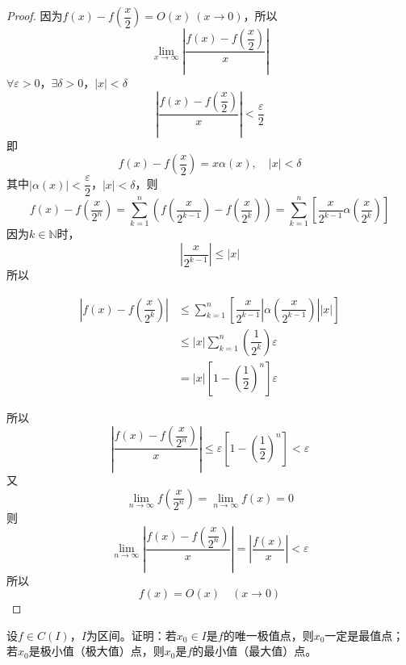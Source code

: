 \begin{proof}

    因为\(f(x) - f\left( \dfrac{x}{2} \right) = O(x) \ (x\to 0)\)，所以
    \[\lim\limits_{x\to\infty}{\left| \dfrac{f(x) - f\left( \dfrac{x}{2} \right)}{x} \right|}\]
    \(\forall \varepsilon > 0\)，\(\exists \delta > 0\)，\(|x| < \delta\)
    \[\left| \dfrac{f(x) - f\left( \dfrac{x}{2} \right)}{x} \right| < \dfrac{\varepsilon}{2}\]
    即
    \[f(x) - f\left( \dfrac{x}{2} \right) = x\alpha(x), \quad |x| < \delta\]
    其中\(|\alpha(x)| < \dfrac{\varepsilon}{2}\)，\(|x| < \delta\)，则
    \[f(x) - f\left( \dfrac{x}{2^n} \right) = \sum\limits_{k  = 1}^{n}{\left( f\left( \dfrac{x}{2^{k - 1}} \right) - f\left( \dfrac{x}{2^k} \right) \right)} = \sum\limits_{k  = 1}^{n}{\left[ \dfrac{x}{2^{k - 1}}\alpha\left( \dfrac{x}{2^k} \right) \right]}\]
    因为\(k \in \mathbb{N}\)时，
    \[\left| \dfrac{x}{2^{k - 1}} \right| \leq |x|\]
    所以

    \begin{align*}
        \left| f(x) - f\left( \dfrac{x}{2^k} \right) \right| & \leq \sum\limits_{k  = 1}^{n}{\left[ \dfrac{x}{2^{k - 1}} \left| \alpha\left( \dfrac{x}{2^{k - 1}} \right) \right| |x| \right]} \\
        & \leq |x| \sum\limits_{k  = 1}^{n}{\left( \dfrac{1}{2^k} \right)} \varepsilon \\
        & = |x| \left[ 1 - \left( \dfrac{1}{2} \right)^n \right] \varepsilon 
    \end{align*}

    所以
    \[\left| \dfrac{f(x) - f\left( \dfrac{x}{2^n} \right)}{x} \right| \leq \varepsilon \left[ 1 - \left( \dfrac{1}{2} \right)^n \right] < \varepsilon\]
    又
    \[\lim\limits_{n \to \infty}{f\left( \dfrac{x}{2^n} \right)} = \lim\limits_{n \to \infty}{f(x)} = 0\]
    则
    \[\lim\limits_{n \to \infty}{\left| \dfrac{f(x) - f\left( \dfrac{x}{2^n} \right)}{x} \right|} = \left| \dfrac{f(x)}{x} \right| < \varepsilon \]
    所以
    \[f(x) = O(x) \quad (x \to 0)\]

\end{proof}

\begin{proposition}

    设\(f \in C(I)\)，\(I\)为区间。证明：若\(x_0 \in I\)是\(f\)的唯一极值点，则\(x_0\)一定是最值点；若\(x_0\)是极小值（极大值）点，则\(x_0\)是\(f\)的最小值（最大值）点。

\end{proposition}

